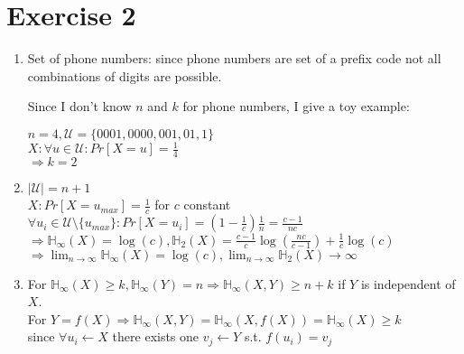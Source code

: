 \documentclass[11pt]{scrartcl}
\begin{document}
\section*{Exercise 2}
\begin{enumerate}
	\item Set of phone numbers: since phone numbers are set of a prefix code not all combinations of digits are possible.

		Since I don't know $n$ and $k$ for phone numbers, I give a toy example:

		$n=4, \mathcal{U}=\{0001,0000,001,01,1\}$\\
		$X:\forall u\in\mathcal{U}:Pr[X=u]=\frac{1}{4}$\\
		$\Rightarrow k=2$

	\item $|\mathcal{U}|=n+1$\\
		$X:Pr[X=u_{max}]=\frac{1}{c}$ for $c$ constant\\
		$\forall u_i \in \mathcal{U}\setminus\{u_{max}\}:Pr[X=u_i]=(1-\frac{1}{c})\frac{1}{n}=\frac{c-1}{nc}$\\
		
		$\Rightarrow \mathbb{H}_{\infty}(X) = \log(c), \mathbb{H}_{2}(X) = \frac{c-1}{c}\log(\frac{nc}{c-1})+\frac{1}{c} \log(c)$\\
		$\Rightarrow \lim_{n\to \infty} \mathbb{H}_{\infty}(X) = \log(c), \lim_{n\to \infty} \mathbb{H}_{2}(X) \to \infty$

	\item For $\mathbb{H}_{\infty}(X)\geq k, \mathbb{H}_{\infty}(Y)=n \Rightarrow \mathbb{H}_{\infty}(X,Y)\geq n+k$ if $Y$ is independent of $X$.\\
		For $Y=f(X) \Rightarrow \mathbb{H}_{\infty}(X,Y)=\mathbb{H}_{\infty}(X,f(X))=\mathbb{H}_{\infty}(X)\geq k$\\
		since $\forall u_i \leftarrow X$ there exists one $v_j \leftarrow Y$ s.t. $f(u_i)=v_j$
\end{enumerate}
\end{document}
